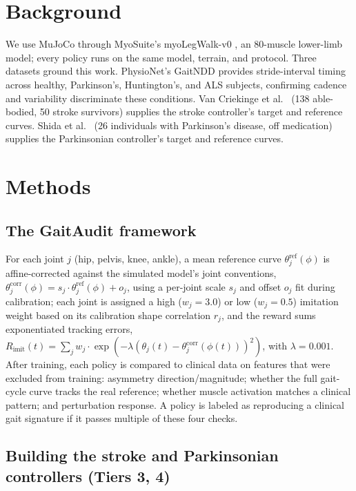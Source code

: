 \documentclass{article}
\begin{document}
\section{Background}

We use MuJoCo through MyoSuite's myoLegWalk-v0 \cite{caggiano2022myosuite}, an 80-muscle lower-limb model; every policy runs on the same model, terrain, and protocol. Three datasets ground this work. PhysioNet's GaitNDD \cite{hausdorff2000dynamic,goldberger2000physiobank} provides stride-interval timing across healthy, Parkinson's, Huntington's, and ALS subjects, confirming cadence and variability discriminate these conditions. Van Criekinge et al.~\cite{vancriekinge2023fullbody} (138 able-bodied, 50 stroke survivors) supplies the stroke controller's target and reference curves. Shida et al.~\cite{shida2023public} (26 individuals with Parkinson's disease, off medication) supplies the Parkinsonian controller's target and reference curves.

\section{Methods}
\label{sec:methods}

\subsection{The GaitAudit framework}

For each joint $j$ (hip, pelvis, knee, ankle), a mean reference curve $\theta_j^{\mathrm{ref}}(\phi)$ is affine-corrected against the simulated model's joint conventions, $\theta_j^{\mathrm{corr}}(\phi) = s_j \cdot \theta_j^{\mathrm{ref}}(\phi) + o_j$, using a per-joint scale $s_j$ and offset $o_j$ fit during calibration; each joint is assigned a high ($w_j=3.0$) or low ($w_j=0.5$) imitation weight based on its calibration shape correlation $r_j$, and the reward sums exponentiated tracking errors, $R_{\mathrm{imit}}(t) = \sum_j w_j \cdot \exp\!\left(-\lambda\left(\theta_j(t) - \theta_j^{\mathrm{corr}}(\phi(t))\right)^2\right)$, with $\lambda = 0.001$. After training, each policy is compared to clinical data on features that were excluded from training: asymmetry direction/magnitude; whether the full gait-cycle curve tracks the real reference; whether muscle activation matches a clinical pattern; and perturbation response. A policy is labeled as reproducing a clinical gait signature if it passes multiple of these four checks.

\subsection{Building the stroke and Parkinsonian controllers (Tiers 3, 4)}
\end{document}
